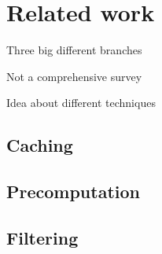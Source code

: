 \chapter{Related work}
\label{sec:related}


Three big different branches

Not a comprehensive survey

Idea about different techniques

\section{Caching}

\section{Precomputation}

\section{Filtering}

